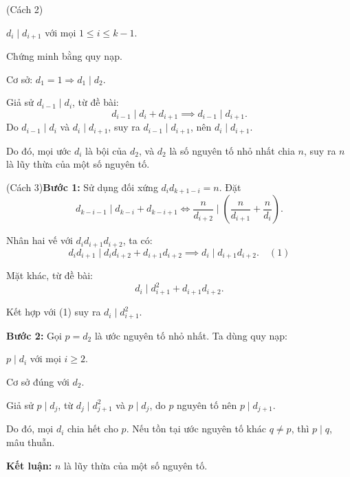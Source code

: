 \documentclass[../01-divisibility.tex]{subfiles}
\begin{document}
\begin{soln}(Cách 2)\footnotemark[\value{footnote}]
    \begin{claim*}
        \( d_i \mid d_{i+1} \) với mọi \( 1 \leq i \leq k - 1 \).
    \end{claim*}
    \begin{subproof}
        Chứng minh bằng quy nạp.

        Cơ sở: \( d_1 = 1 \Rightarrow d_1 \mid d_2 \).

        Giả sử \( d_{i-1} \mid d_i \), từ đề bài:
        \[
            d_{i-1} \mid d_i + d_{i+1} \implies d_{i-1} \mid d_{i+1}.
        \]
        Do \( d_{i-1} \mid d_i \) và \( d_i \mid d_{i+1} \), suy ra \( d_{i-1} \mid d_{i+1} \), nên \( d_i \mid d_{i+1} \).
    \end{subproof}

    Do đó, mọi ước \( d_i \) là bội của \( d_2 \), và \( d_2 \) là số nguyên tố nhỏ nhất chia \( n \), suy ra \( n \) là lũy thừa của một số nguyên tố.
\end{soln}

\newpage

\begin{soln}(Cách 3)\footnotemark[\value{footnote}]
    \textbf{Bước 1:} Sử dụng đối xứng \( d_i d_{k+1-i} = n \). Đặt
    \[
        d_{k-i-1} \mid d_{k-i} + d_{k-i+1} \Leftrightarrow \frac{n}{d_{i+2}} \mid \left( \frac{n}{d_{i+1}} + \frac{n}{d_i} \right).
    \]

    Nhân hai vế với \( d_i d_{i+1} d_{i+2} \), ta có:
    \[
        d_i d_{i+1} \mid d_i d_{i+2} + d_{i+1} d_{i+2} \implies d_i \mid d_{i+1} d_{i+2}. \quad (1)
    \]

    Mặt khác, từ đề bài:
    \[
        d_i \mid d_{i+1}^2 + d_{i+1} d_{i+2}.
    \]

    Kết hợp với (1) suy ra \( d_i \mid d_{i+1}^2 \).

    \textbf{Bước 2:} Gọi \( p = d_2 \) là ước nguyên tố nhỏ nhất. Ta dùng quy nạp:

    \begin{claim*}
        \( p \mid d_i \) với mọi \( i \geq 2 \).
    \end{claim*}
    \begin{subproof}
        Cơ sở đúng với \( d_2 \).

        Giả sử \( p \mid d_j \), từ \( d_j \mid d_{j+1}^2 \) và \( p \mid d_j \), do \( p \) nguyên tố nên \( p \mid d_{j+1} \).
    \end{subproof}

    Do đó, mọi \( d_i \) chia hết cho \( p \). Nếu tồn tại ước nguyên tố khác \( q \ne p \), thì \( p \mid q \), mâu thuẫn.

    \textbf{Kết luận:} \( n \) là lũy thừa của một số nguyên tố.
\end{soln}

\end{document}
